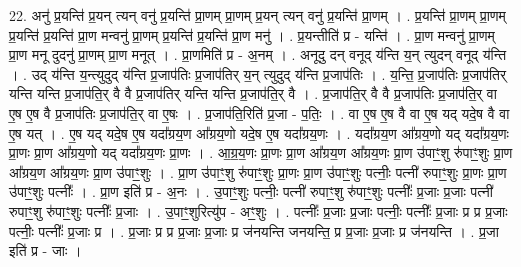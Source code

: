 \documentclass[17pt]{extarticle}
\begin{document}
22. अनु॑ प्र॒यन्ति॑ प्र॒यन् त्यन् वनु॑ प्र॒यन्ति॑ प्रा॒णम् प्रा॒णम् प्र॒यन् त्यन् वनु॑ प्र॒यन्ति॑ प्रा॒णम् । . प्र॒यन्ति॑ प्रा॒णम् प्रा॒णम् प्र॒यन्ति॑ प्र॒यन्ति॑ प्रा॒ण मन्वनु॑ प्रा॒णम् प्र॒यन्ति॑ प्र॒यन्ति॑ प्रा॒ण मनु॑ । . प्र॒यन्तीति॑ प्र - यन्ति॑ । . प्रा॒ण मन्वनु॑ प्रा॒णम् प्रा॒ण मनू दुदनु॑ प्रा॒णम् प्रा॒ण मनूत् । . प्रा॒णमिति॑ प्र - अ॒नम् । . अनूदु दन् वनूद् य॑न्ति य॒न् त्युदन् वनूद् य॑न्ति । . उद् य॑न्ति य॒न्त्युदुद् य॑न्ति प्र॒जाप॑तिः प्र॒जाप॑तिर् य॒न् त्युदुद् य॑न्ति प्र॒जाप॑तिः । . य॒न्ति॒ प्र॒जाप॑तिः प्र॒जाप॑तिर् यन्ति यन्ति प्र॒जाप॑ति॒र् वै वै प्र॒जाप॑तिर् यन्ति यन्ति प्र॒जाप॑ति॒र् वै । . प्र॒जाप॑ति॒र् वै वै प्र॒जाप॑तिः प्र॒जाप॑ति॒र् वा ए॒ष ए॒ष वै प्र॒जाप॑तिः प्र॒जाप॑ति॒र् वा ए॒षः । . प्र॒जाप॑ति॒रिति॑ प्र॒जा - प॒तिः॒ । . वा ए॒ष ए॒ष वै वा ए॒ष यद् यदे॒ष वै वा ए॒ष यत् । . ए॒ष यद् यदे॒ष ए॒ष यदा᳚ग्रय॒ण आ᳚ग्रय॒णो यदे॒ष ए॒ष यदा᳚ग्रय॒णः । . यदा᳚ग्रय॒ण आ᳚ग्रय॒णो यद् यदा᳚ग्रय॒णः प्रा॒णः प्रा॒ण आ᳚ग्रय॒णो यद् यदा᳚ग्रय॒णः प्रा॒णः । . आ॒ग्र॒य॒णः प्रा॒णः प्रा॒ण आ᳚ग्रय॒ण आ᳚ग्रय॒णः प्रा॒ण उ॑पाꣳ॒॒शु रु॑पाꣳ॒॒शुः प्रा॒ण आ᳚ग्रय॒ण आ᳚ग्रय॒णः प्रा॒ण उ॑पाꣳ॒॒शुः । . प्रा॒ण उ॑पाꣳ॒॒शु रु॑पाꣳ॒॒शुः प्रा॒णः प्रा॒ण उ॑पाꣳ॒॒शुः पत्नीः॒ पत्नी॑ रुपाꣳ॒॒शुः प्रा॒णः प्रा॒ण उ॑पाꣳ॒॒शुः पत्नीः᳚ । . प्रा॒ण इति॑ प्र - अ॒नः । . उ॒पाꣳ॒॒शुः पत्नीः॒ पत्नी॑ रुपाꣳ॒॒शु रु॑पाꣳ॒॒शुः पत्नीः᳚ प्र॒जाः प्र॒जाः पत्नी॑ रुपाꣳ॒॒शु रु॑पाꣳ॒॒शुः पत्नीः᳚ प्र॒जाः । . उ॒पाꣳ॒॒शुरित्यु॑प - अꣳ॒॒शुः । . पत्नीः᳚ प्र॒जाः प्र॒जाः पत्नीः॒ पत्नीः᳚ प्र॒जाः प्र प्र प्र॒जाः पत्नीः॒ पत्नीः᳚ प्र॒जाः प्र । . प्र॒जाः प्र प्र प्र॒जाः प्र॒जाः प्र ज॑नयन्ति जनयन्ति॒ प्र प्र॒जाः प्र॒जाः प्र ज॑नयन्ति । . प्र॒जा इति॑ प्र - जाः । \newline
\end{document}
